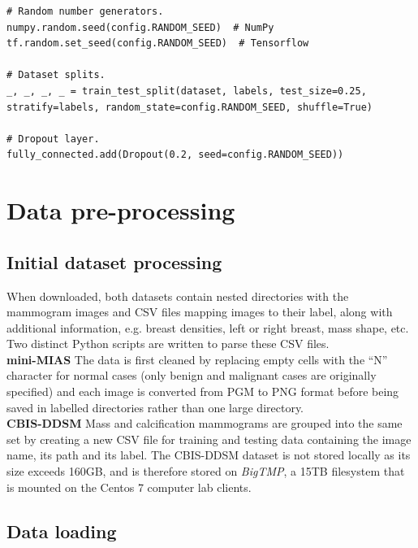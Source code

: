 \begin{lstlisting}[numbers=none]
# Random number generators.
numpy.random.seed(config.RANDOM_SEED)  # NumPy
tf.random.set_seed(config.RANDOM_SEED)  # Tensorflow

# Dataset splits.
_, _, _, _ = train_test_split(dataset, labels, test_size=0.25, stratify=labels, random_state=config.RANDOM_SEED, shuffle=True)

# Dropout layer.
fully_connected.add(Dropout(0.2, seed=config.RANDOM_SEED))
\end{lstlisting}


\section{Data pre-processing}

\subsection{Initial dataset processing}

When downloaded, both datasets contain nested directories with the mammogram images and CSV files mapping images to their label, along with additional information, e.g. breast densities, left or right breast, mass shape, etc. Two distinct Python scripts are written to parse these CSV files.\\

\textbf{mini-MIAS} \space The data is first cleaned by replacing empty cells with the ``N'' character for normal cases (only benign and malignant cases are originally specified) and each image is converted from PGM to PNG format before being saved in labelled directories rather than one large directory.\\

\textbf{CBIS-DDSM} \space Mass and calcification mammograms are grouped into the same set by creating a new CSV file for training and testing data containing the image name, its path and its label. The CBIS-DDSM dataset is not stored locally as its size exceeds 160GB, and is therefore stored on \textit{BigTMP}, a 15TB filesystem that is mounted on the Centos 7 computer lab clients.


\subsection{Data loading}


